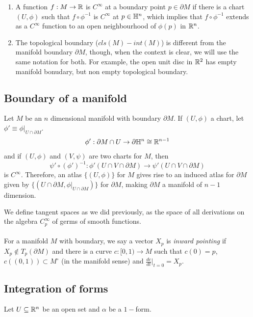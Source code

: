 \begin{remark}
    \begin{enumerate}
        \item A function $f:M\to \mathbb{R}$ is $C^{\infty}$ at a boundary point $p\in \partial M$ if there is a chart $(U,\phi)$ such that $f\circ \phi^{-1}$ is $C^{\infty}$ at $p\in \mathbb{H}^n$, which implies that $f\circ \phi^{-1}$  extends as a $C^{\infty}$ function to an open neighbourhood of $\phi(p)$ in $\mathbb{R}^n$.
        \item The topological boundary ($cls(M)-int(M)$) is different from the manifold boundary $\partial M$, though, when the context is clear, we will use the same notation for both. For example, the open unit disc in $\mathbb{R}^2$ has empty manifold bonudary, but non empty topological boundary.
    \end{enumerate}
\end{remark}
\subsection{Boundary of a manifold}
Let $M$ be an $n$ dimensional manifold with boundary $\partial M$. If $(U,\phi)$ a chart, let $\phi'\equiv \phi|_{U\cap \partial M}$. $$\phi':\partial M \cap U\to \partial \mathbb{H}^n\cong \mathbb{R}^{n-1} $$
and if $(U,\phi)$ and $(V,\psi)$ are two charts for $M$, then $$\psi' \circ (\phi')^{-1}: \phi'(U\cap V\cap \partial M)\to \psi'(U\cap V\cap \partial M) $$ is $C^{\infty}$. Therefore, an atlas $\{(U,\phi)\}$ for $M$ gives rise to an induced atlas for $\partial M$ given by $\{(U\cap \partial M, \phi|_{U\cap \partial M})\}$ for $\partial M$, making $\partial M$ a manifold of $n-1$ dimension. 

We define tangent spaces as we did previously, as the space of all derivations on the algebra $C^{\infty}_p$ of germs of smooth functions.
\\\\ For a manifold $M$ with boundary, we say a vector $X_p$ is \emph{inward pointing} if $X_p \not \in T_p(\partial M)$ and there is a curve $c:[0,1)\to M$ such that $c(0)=p$, $c((0,1))\subset M^{\circ}$ (in the manifold sense) and $\frac{dc}{dt}|_{t=0}=X_p$.

\subsection{Integration of forms}
Let $U\subseteq \mathbb{R}^n$ be an open set and $\alpha$ be a $1-$form. 


